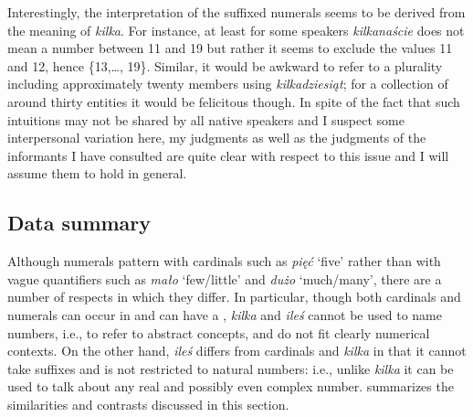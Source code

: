 \documentclass[output=paper, newtxmath, colorlinks, citecolor=brown]{langsci/langscibook}
\begin{document}
	\noindent Interestingly, the interpretation of the suffixed  numerals seems to be derived from the meaning of \textit{kilka}. For instance, at least for some speakers \textit{kilkanaście} does not mean a number between 11 and 19 but rather it seems to exclude the values 11 and 12, hence \{13,\dots, 19\}. Similar, it would be awkward to refer to a plurality including approximately twenty members using \textit{kilkadziesiąt}; for a collection of around thirty entities it would be felicitous though. In spite of the fact that such intuitions may not be shared by all native speakers and I suspect some interpersonal variation here, my judgments as well as the judgments of the informants I have consulted are quite clear with respect to this issue and I will assume them to hold in general.

	\subsection{Data summary}\label{sec:data-summary2}

	Although   numerals pattern with cardinals such as \textit{pięć} `five' rather than with vague quantifiers such as \textit{mało} `few/little' and \textit{dużo} `much/many', there are a number of respects in which they differ. In particular, though both cardinals and  numerals can occur in  and can have a , \textit{kilka} and \textit{ileś} cannot be used to name numbers, i.e., to refer to abstract concepts, and do not fit clearly numerical contexts. On the other hand, \textit{ileś} differs from cardinals and \textit{kilka} in that it cannot take  suffixes and is not restricted to natural numbers: i.e., unlike \textit{kilka} it can be used to talk about any real and possibly even complex number.  summarizes the similarities and contrasts discussed in this section.
\end{document}
